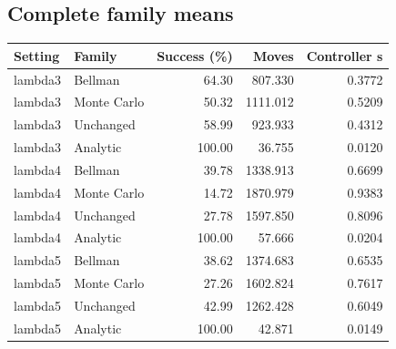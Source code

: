 \documentclass[10pt]{article}
\begin{document}
\subsection*{Complete family means}
{\small\centering
\begin{tabular}{llrrr}
\toprule
Setting & Family & Success (\%) & Moves & Controller s \\ \midrule
lambda3 & Bellman & 64.30 & 807.330 & 0.3772 \\
lambda3 & Monte Carlo & 50.32 & 1111.012 & 0.5209 \\
lambda3 & Unchanged & 58.99 & 923.933 & 0.4312 \\
lambda3 & Analytic & 100.00 & 36.755 & 0.0120 \\
lambda4 & Bellman & 39.78 & 1338.913 & 0.6699 \\
lambda4 & Monte Carlo & 14.72 & 1870.979 & 0.9383 \\
lambda4 & Unchanged & 27.78 & 1597.850 & 0.8096 \\
lambda4 & Analytic & 100.00 & 57.666 & 0.0204 \\
lambda5 & Bellman & 38.62 & 1374.683 & 0.6535 \\
lambda5 & Monte Carlo & 27.26 & 1602.824 & 0.7617 \\
lambda5 & Unchanged & 42.99 & 1262.428 & 0.6049 \\
lambda5 & Analytic & 100.00 & 42.871 & 0.0149 \\
\bottomrule
\end{tabular}
\par}
\end{document}
